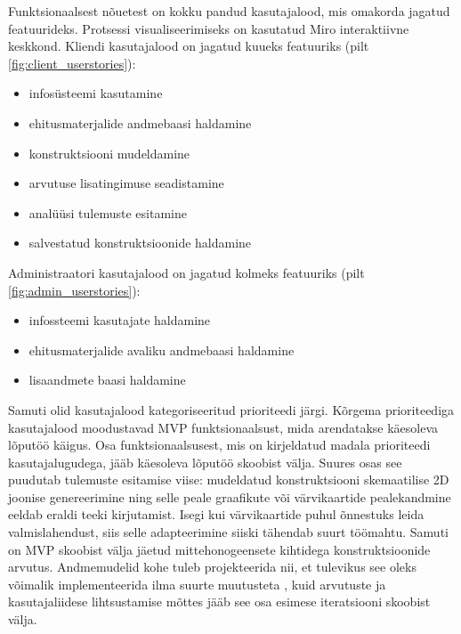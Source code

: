 Funktsionaalsest nõuetest on kokku pandud kasutajalood, mis omakorda jagatud featuurideks. Protsessi visualiseerimiseks on kasutatud Miro interaktiivne
keskkond. Kliendi kasutajalood on jagatud kuueks featuuriks (pilt \ref{fig:client_userstories}):
\begin{itemize}
    \item infosüsteemi kasutamine
    \item ehitusmaterjalide andmebaasi haldamine
    \item konstruktsiooni mudeldamine
    \item arvutuse lisatingimuse seadistamine
    \item analüüsi tulemuste esitamine
    \item salvestatud konstruktsioonide haldamine
\end{itemize}

Administraatori kasutajalood on jagatud kolmeks featuuriks (pilt \ref{fig:admin_userstories}):
\begin{itemize}
    \item infossteemi kasutajate haldamine
    \item ehitusmaterjalide avaliku andmebaasi haldamine
    \item lisaandmete baasi haldamine
\end{itemize}

Samuti olid kasutajalood kategoriseeritud prioriteedi järgi. Kõrgema prioriteediga kasutajalood moodustavad MVP funktsionaalsust, mida arendatakse käesoleva lõputöö käigus.
Osa funktsionaalsusest, mis on kirjeldatud madala prioriteedi kasutajalugudega, jääb käesoleva lõputöö skoobist välja. Suures osas see puudutab tulemuste esitamise
viise: mudeldatud konstruktsiooni skemaatilise 2D joonise genereerimine ning selle peale graafikute või värvikaartide pealekandmine eeldab 
eraldi teeki kirjutamist. Isegi kui värvikaartide puhul õnnestuks leida valmislahendust, siis selle adapteerimine siiski tähendab suurt töömahtu.
Samuti on MVP skoobist välja jäetud mittehonogeensete kihtidega konstruktsioonide arvutus. Andmemudelid kohe tuleb projekteerida nii, et tulevikus
see oleks võimalik implementeerida ilma suurte muutusteta , kuid arvutuste ja kasutajaliidese lihtsustamise mõttes jääb see osa esimese iteratsiooni skoobist välja.


